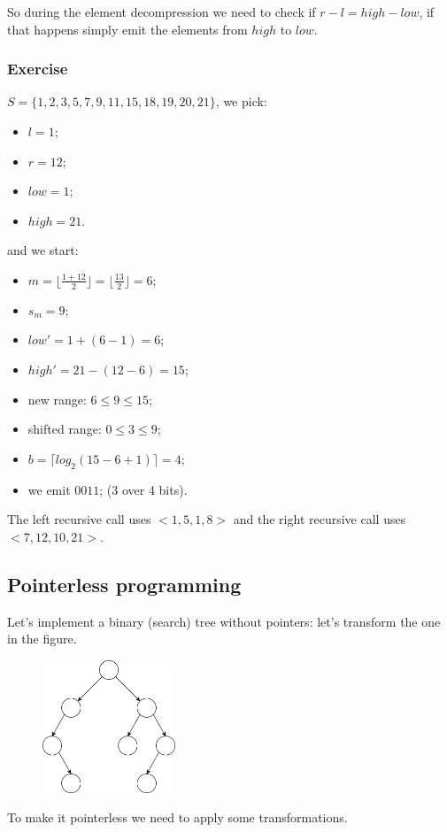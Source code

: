 So during the element decompression we need to check if $r-l = high-low$, if that happens simply emit the elements from $high$ to $low$.


\subsubsection{Exercise}
$S = \{ 1, 2, 3, 5, 7, 9, 11, 15, 18, 19, 20, 21 \}$, we pick:
\begin{itemize}
    \item $l = 1$;
    \item $r = 12$;
    \item $low = 1$;
    \item $high = 21$.
\end{itemize}
and we start:
\begin{itemize}
    \item $m = \lfloor \frac{1+12}{2} \rfloor = \lfloor \frac{13}{2} \rfloor = 6$;
    \item $s_m = 9$;
    \item $low' = 1 + (6-1) = 6$;
    \item $high' = 21 - (12-6) = 15$;
    \item new range: $6 \leq 9 \leq 15$;
    \item shifted range: $0 \leq 3 \leq 9$;
    \item $b = \lceil log_2 (15-6+1) \rceil = 4$;
    \item we emit $0011$; (3 over 4 bits).
\end{itemize}

The left recursive call uses $<1, 5, 1, 8>$ and the right recursive call uses $<7, 12, 10, 21>$.


\subsection{Pointerless programming}
Let's implement a binary (search) tree without pointers: let's transform  the one in the figure.
\begin{figure}[H]
    \centering
    \includegraphics[width=150px]{images/10_Data_compression/pointerless_programming_start.png}
\end{figure}
To make it pointerless we need to apply some transformations.

